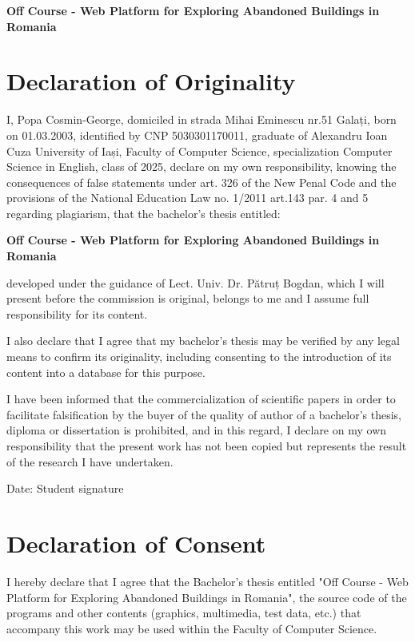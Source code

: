 \documentclass[12pt,a4paper]{report}
\begin{document}
\textbf{Off Course - Web Platform for Exploring Abandoned Buildings in Romania}

\newpage

\chapter*{Declaration of Originality}

I, Popa Cosmin-George, domiciled in strada Mihai Eminescu nr.51 Galați, born on 01.03.2003, identified by CNP 5030301170011, graduate of Alexandru Ioan Cuza University of Iași, Faculty of Computer Science, specialization Computer Science in English, class of 2025, declare on my own responsibility, knowing the consequences of false statements under art. 326 of the New Penal Code and the provisions of the National Education Law no. 1/2011 art.143 par. 4 and 5 regarding plagiarism, that the bachelor's thesis entitled:

\textbf{Off Course - Web Platform for Exploring Abandoned Buildings in Romania}

developed under the guidance of Lect. Univ. Dr. Pătruț Bogdan, which I will present before the commission is original, belongs to me and I assume full responsibility for its content.

I also declare that I agree that my bachelor's thesis may be verified by any legal means to confirm its originality, including consenting to the introduction of its content into a database for this purpose.

I have been informed that the commercialization of scientific papers in order to facilitate falsification by the buyer of the quality of author of a bachelor's thesis, diploma or dissertation is prohibited, and in this regard, I declare on my own responsibility that the present work has not been copied but represents the result of the research I have undertaken.

\vspace{2cm}
Date: \hfill Student signature

\newpage

\chapter*{Declaration of Consent}

I hereby declare that I agree that the Bachelor's thesis entitled "Off Course - Web Platform for Exploring Abandoned Buildings in Romania", the source code of the programs and other contents (graphics, multimedia, test data, etc.) that accompany this work may be used within the Faculty of Computer Science.
\end{document}
